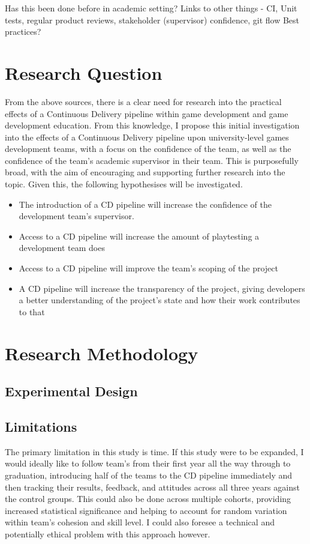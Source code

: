 \documentclass[lettersize,journal]{IEEEtran}
\begin{document}
    Has this been done before in academic setting\cite{CDCourse2014,CDMobileDev,IndustryAcademyDenmark}? 
    Links to other things - CI\cite{CICDCD}, Unit tests, regular product reviews, stakeholder (supervisor) confidence, git flow \cite{gitBranching}
    Best practices\cite{duvall2007continuous}? 

\section{Research Question}
    From the above sources, there is a clear need for research into the practical effects of a Continuous Delivery pipeline within game development and game development education. From this knowledge, I propose this initial investigation into the effects of a Continuous Delivery pipeline upon university-level games development teams, with a focus on the confidence of the team, as well as the confidence of the team's academic supervisor in their team. 
    This is purposefully broad, with the aim of encouraging and supporting further research into the topic. Given this, the following hypothesises will be investigated.

    \begin{itemize}
        \item The introduction of a CD pipeline will increase the confidence of the development team's supervisor.
        \item Access to a CD pipeline will increase the amount of playtesting a development team does
        \item Access to a CD pipeline will improve the team's scoping of the project
        \item A CD pipeline will increase the transparency of the project, giving developers a better understanding of the project's state and how their work contributes to that
    \end{itemize}

\section{Research Methodology}
    \subsection{Experimental Design}
        

    \subsection{Limitations}
        The primary limitation in this study is time. If this study were to be expanded, I would ideally like to follow team's from their first year all the way through to graduation, introducing half of the teams to the CD pipeline immediately and then tracking their results, feedback, and attitudes across all three years against the control groups. This could also be done across multiple cohorts, providing increased statistical significance and helping to account for random variation within team's cohesion and skill level. I could also foresee a technical and potentially ethical problem with this approach however.
        
\end{document}
